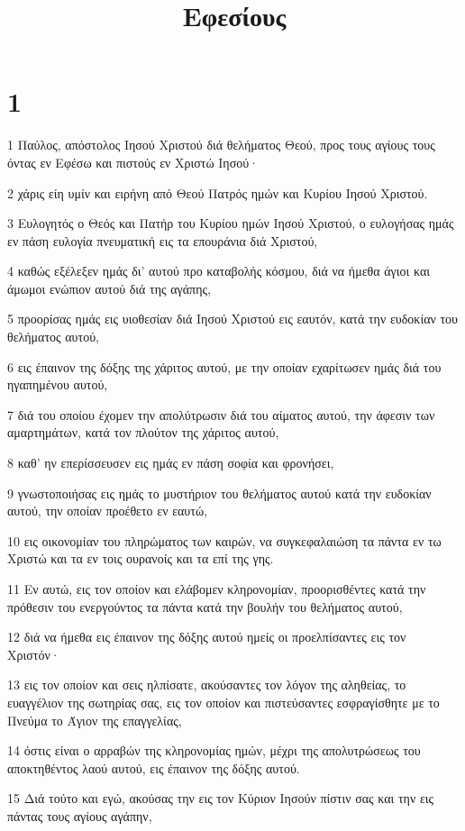 

\title{Εφεσίους}


\chapter{1}

\par 1 Παύλος, απόστολος Ιησού Χριστού διά θελήματος Θεού, προς τους αγίους τους όντας εν Εφέσω και πιστούς εν Χριστώ Ιησού·
\par 2 χάρις είη υμίν και ειρήνη από Θεού Πατρός ημών και Κυρίου Ιησού Χριστού.
\par 3 Ευλογητός ο Θεός και Πατήρ του Κυρίου ημών Ιησού Χριστού, ο ευλογήσας ημάς εν πάση ευλογία πνευματική εις τα επουράνια διά Χριστού,
\par 4 καθώς εξέλεξεν ημάς δι' αυτού προ καταβολής κόσμου, διά να ήμεθα άγιοι και άμωμοι ενώπιον αυτού διά της αγάπης,
\par 5 προορίσας ημάς εις υιοθεσίαν διά Ιησού Χριστού εις εαυτόν, κατά την ευδοκίαν του θελήματος αυτού,
\par 6 εις έπαινον της δόξης της χάριτος αυτού, με την οποίαν εχαρίτωσεν ημάς διά του ηγαπημένου αυτού,
\par 7 διά του οποίου έχομεν την απολύτρωσιν διά του αίματος αυτού, την άφεσιν των αμαρτημάτων, κατά τον πλούτον της χάριτος αυτού,
\par 8 καθ' ην επερίσσευσεν εις ημάς εν πάση σοφία και φρονήσει,
\par 9 γνωστοποιήσας εις ημάς το μυστήριον του θελήματος αυτού κατά την ευδοκίαν αυτού, την οποίαν προέθετο εν εαυτώ,
\par 10 εις οικονομίαν του πληρώματος των καιρών, να συγκεφαλαιώση τα πάντα εν τω Χριστώ και τα εν τοις ουρανοίς και τα επί της γης.
\par 11 Εν αυτώ, εις τον οποίον και ελάβομεν κληρονομίαν, προορισθέντες κατά την πρόθεσιν του ενεργούντος τα πάντα κατά την βουλήν του θελήματος αυτού,
\par 12 διά να ήμεθα εις έπαινον της δόξης αυτού ημείς οι προελπίσαντες εις τον Χριστόν·
\par 13 εις τον οποίον και σεις ηλπίσατε, ακούσαντες τον λόγον της αληθείας, το ευαγγέλιον της σωτηρίας σας, εις τον οποίον και πιστεύσαντες εσφραγίσθητε με το Πνεύμα το Άγιον της επαγγελίας,
\par 14 όστις είναι ο αρραβών της κληρονομίας ημών, μέχρι της απολυτρώσεως του αποκτηθέντος λαού αυτού, εις έπαινον της δόξης αυτού.
\par 15 Διά τούτο και εγώ, ακούσας την εις τον Κύριον Ιησούν πίστιν σας και την εις πάντας τους αγίους αγάπην,
